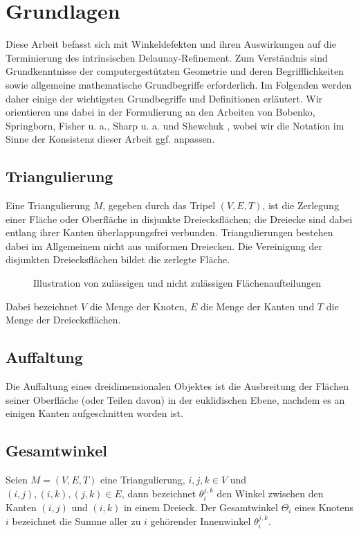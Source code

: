 \chapter{Grundlagen}
Diese Arbeit befasst sich mit Winkeldefekten und ihren Auswirkungen auf die Terminierung des intrinsischen Delaunay-Refinement. Zum Verständnis sind Grundkenntnisse der computergestützten Geometrie und deren Begrifflichkeiten sowie allgemeine mathematische Grundbegriffe erforderlich. Im Folgenden werden daher einige der wichtigsten Grundbegriffe und Definitionen erläutert. Wir orientieren uns dabei in der
Formulierung an den Arbeiten von 
 Bobenko, Springborn, Fisher u. a., Sharp u. a. und Shewchuk
 \cite{Bobenko:2006:SIGGRAPH,Sharp:2019:NIT,Bobenko:2007:LaplaceBeltrami,shewchuk:1997:delaunay,SHEWCHUK:2002:chuws},
wobei wir die Notation im Sinne der Konsistenz dieser Arbeit ggf. anpassen.

\section*{Triangulierung}

Eine Triangulierung $M$, gegeben durch das Tripel $  (V, E, T) $, ist die Zerlegung einer Fläche oder Oberfläche in disjunkte Dreiecksflächen; die Dreiecke sind dabei entlang ihrer Kanten überlappungsfrei verbunden.
Triangulierungen bestehen dabei im Allgemeinem nicht aus uniformen Dreiecken.
Die Vereinigung der disjunkten Dreiecksflächen bildet die zerlegte Fläche. \\  

\begin{figure}[h]%
    \centering
  
  \caption{Illustration von zulässigen und nicht zulässigen Flächenaufteilungen}
\end{figure}

Dabei bezeichnet  $V$ die Menge der Knoten, $E$ die Menge der Kanten und $T$ die Menge der Dreiecksflächen.


\section*{Auffaltung}
Die Auffaltung eines dreidimensionalen Objektes ist die Ausbreitung der Flächen seiner Oberfläche (oder Teilen davon) in der euklidischen Ebene, nachdem es an einigen Kanten aufgeschnitten worden ist. 

\section*{Gesamtwinkel}
\label{def:gesamtwinkel}
Seien $M = (V, E, T)$ eine Triangulierung, $i,j,k \in V$ und $(i, j),(i, k),(j, k) \in E$, dann bezeichnet $\theta_i^{j,k}$ den Winkel zwischen den Kanten  $(i, j)$ und $(i, k)$ in einem Dreieck. Der Gesamtwinkel $ \Theta_i$ eines Knotens $i$ bezeichnet die Summe aller zu $i$ gehörender Innenwinkel $\theta_i^{j,k}$.


